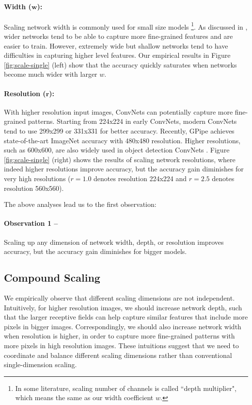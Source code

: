 \documentclass{article}
\begin{document}
\paragraph{Width ($\pmb w$): } Scaling network width is commonly used for small size models \cite{mobilenetv117, mobilenetv218, mnas18}\footnote{In some literature, scaling number of channels is called ``depth multiplier", which means the same as our width coefficient $w$.}. As discussed in \cite{wideresnet16}, wider networks tend to be able to capture more fine-grained features and are easier to train. However, extremely wide but shallow networks tend to have difficulties in capturing higher level features. Our empirical results in Figure \ref{fig:scale-single} (left) show that the accuracy quickly saturates when networks become much wider with larger $w$.

\paragraph{Resolution ($\pmb r$): } With higher resolution input images, ConvNets can potentially capture more fine-grained patterns. Starting from 224x224 in early ConvNets, modern ConvNets tend to use 299x299 \cite{inceptionv316} or 331x331 \cite{nas_imagenet18} for better accuracy. Recently, GPipe \cite{gpipe18} achieves state-of-the-art ImageNet accuracy with 480x480 resolution. Higher resolutions, such as 600x600, are also widely used in object detection ConvNets \cite{maskrcnn17,retinanet17}. Figure \ref{fig:scale-single} (right) shows the results of scaling network resolutions, where indeed higher resolutions improve accuracy, but the accuracy gain diminishes for very high resolutions ($r=1.0$ denotes resolution 224x224 and $r=2.5$ denotes resolution 560x560).

The above analyses lead us to the first observation: 

\noindent \paragraph{Observation 1 -- } Scaling up any dimension of  network width, depth, or resolution improves accuracy, but the accuracy gain diminishes for bigger models.

\subsection{Compound Scaling}

We empirically observe that different scaling dimensions are not independent. Intuitively, for higher resolution images, we should increase network depth, such that the larger receptive fields can help capture similar features that include more pixels in bigger images. Correspondingly, we should also increase network width when resolution is higher,  in order to capture more fine-grained patterns with more pixels in high resolution images. These intuitions suggest that we need to coordinate and balance different scaling dimensions rather than conventional single-dimension scaling.
\end{document}
